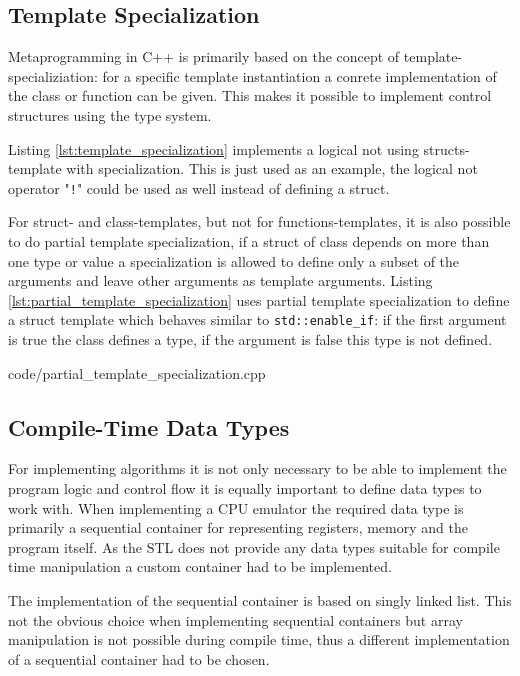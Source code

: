 \subsection{Template Specialization}
Metaprogramming in C++ is primarily based on the concept of template-specializiation: for a specific template instantiation
a conrete implementation of the class or function can be given. This makes it possible to implement control structures
using the type system. 

Listing \ref{lst:template_specialization} implements a logical not using structs-template with specialization. This is just used as an example, the logical not operator "\lstinline{!}" could be used as well instead of defining a struct.



For struct- and class-templates, but not for functions-templates, it is also possible to do partial template 
specialization, if a struct of class depends on more than one type or value a specialization is allowed to define
only a subset of the arguments and leave other arguments as template arguments. Listing
\ref{lst:partial_template_specialization} uses partial template specialization to define a struct template which
behaves similar to \lstinline{std::enable_if}: if the first argument is true the class defines a type, if the
argument is false this type is not defined.


    {code/partial_template_specialization.cpp}

\subsection{Compile-Time Data Types}
For implementing algorithms it is not only necessary to be able to implement the program logic and control flow
it is equally important to define data types to work with. When implementing a CPU emulator the required data type
is primarily a sequential container for representing registers, memory and the program itself. 
As the STL does not provide any data types suitable for compile time manipulation a custom container had to be implemented.

The implementation of the sequential container is based on singly linked list. 
This not the obvious choice when implementing sequential containers but array manipulation is not possible during 
compile time, thus a different implementation of a sequential container had to be chosen.

